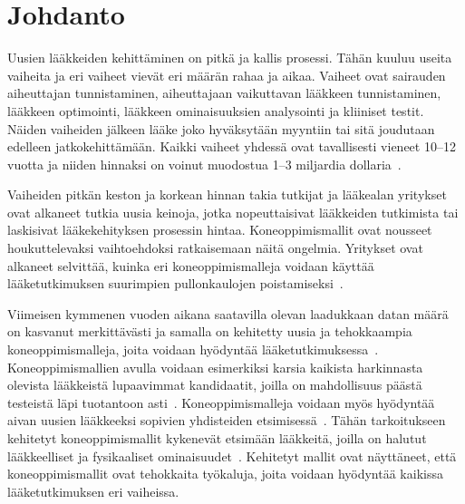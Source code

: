 \documentclass[finnish,twoside,censored,tkt,sw-line]{HYthesisML}
\begin{document}
\newpage
\mytableofcontents{}
\mainmatter{}


%
%
%
% 


\chapter{Johdanto}

Uusien lääkkeiden kehittäminen on pitkä ja kallis prosessi.
Tähän kuuluu useita vaiheita ja eri vaiheet vievät eri määrän rahaa ja aikaa.
Vaiheet ovat sairauden aiheuttajan tunnistaminen, aiheuttajaan vaikuttavan lääkkeen tunnistaminen, lääkkeen optimointi, lääkkeen ominaisuuksien analysointi ja kliiniset testit.
Näiden vaiheiden jälkeen lääke joko hyväksytään myyntiin tai sitä joudutaan edelleen jatkokehittämään.
Kaikki vaiheet yhdessä ovat tavallisesti vieneet 10--12 vuotta ja niiden hinnaksi on voinut muodostua 1--3 miljardia dollaria~\cite{EkinsSean2019Emlf}.

Vaiheiden pitkän keston ja korkean hinnan takia tutkijat ja lääkealan yritykset ovat alkaneet tutkia uusia keinoja, jotka nopeuttaisivat lääkkeiden tutkimista tai laskisivat lääkekehityksen prosessin hintaa.
Koneoppimismallit ovat nousseet houkuttelevaksi vaihtoehdoksi ratkaisemaan näitä ongelmia.
Yritykset ovat alkaneet selvittää, kuinka eri koneoppimismalleja voidaan käyttää lääketutkimuksen suurimpien pullonkaulojen poistamiseksi~\cite{EkinsSean2019Emlf}.

Viimeisen kymmenen vuoden aikana saatavilla olevan laadukkaan datan määrä on kasvanut merkittävästi ja samalla on kehitetty uusia ja tehokkaampia koneoppimismalleja, joita voidaan hyödyntää lääketutkimuksessa~\cite{ButlerKeithT2018Mlfm,VamathevanJessica2019Aoml}.
Koneoppimismallien avulla voidaan esimerkiksi karsia kaikista harkinnasta olevista lääkkeistä lupaavimmat kandidaatit, joilla on mahdollisuus päästä testeistä läpi tuotantoon asti~\cite{GayvertKaitlyn}.
Koneoppimismalleja voidaan myös hyödyntää aivan uusien lääkkeeksi sopivien yhdisteiden etsimisessä~\cite{ShinBonggun,ShaharHarelAndKiraRadinsky}.
Tähän tarkoitukseen kehitetyt koneoppimismallit kykenevät etsimään lääkkeitä, joilla on halutut lääkkeelliset ja fysikaaliset ominaisuudet~\cite{VamathevanJessica2019Aoml}.
Kehitetyt mallit ovat näyttäneet, että koneoppimismallit ovat tehokkaita työkaluja, joita voidaan hyödyntää kaikissa lääketutkimuksen eri vaiheissa.
\end{document}
